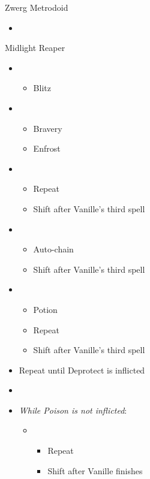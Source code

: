 \begin{battle}{Zwerg Metrodoid}
\begin{itemize}
   \item {}
\end{itemize}
\end{battle}
\begin{battle}{Midlight Reaper}
\begin{itemize}
    \item \first
    \begin{itemize}
        \item Blitz
    \end{itemize}
    \item \third
    \begin{itemize}
        \item Bravery
        \item Enfrost
    \end{itemize}
    \item \sixth
    \begin{itemize}
        \item Repeat
        \item Shift after Vanille's third spell
    \end{itemize}
    \item \fifth
    \begin{itemize}
        \item Auto-chain
        \item Shift after Vanille's third spell
    \end{itemize}
    \item \sixth
    \begin{itemize}
        \item Potion
        \item Repeat
        \item Shift after Vanille's third spell
    \end{itemize}
    \item Repeat until Deprotect is inflicted
    \item \stagger
    \item \textit{While Poison is not inflicted}:
    \begin{itemize}
        \item \first
        \begin{itemize}
            \item Repeat
            \item Shift after Vanille finishes

\end{itemize}
\end{itemize}
\end{itemize}
\end{battle}
